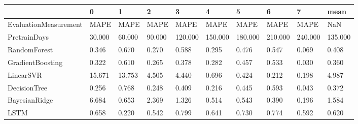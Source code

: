 \begin{tabular}{llllllllll}
\toprule
{} &      0 &      1 &      2 &       3 &       4 &       5 &       6 &       7 &    mean \\
\midrule
EvaluationMeasurement &   MAPE &   MAPE &   MAPE &    MAPE &    MAPE &    MAPE &    MAPE &    MAPE &     NaN \\
PretrainDays          & 30.000 & 60.000 & 90.000 & 120.000 & 150.000 & 180.000 & 210.000 & 240.000 & 135.000 \\
RandomForest          &  0.346 &  0.670 &  0.270 &   0.588 &   0.295 &   0.476 &   0.547 &   0.069 &   0.408 \\
GradientBoosting      &  0.322 &  0.610 &  0.265 &   0.378 &   0.282 &   0.457 &   0.533 &   0.030 &   0.360 \\
LinearSVR             & 15.671 & 13.753 &  4.505 &   4.440 &   0.696 &   0.424 &   0.212 &   0.198 &   4.987 \\
DecisionTree          &  0.256 &  0.768 &  0.248 &   0.409 &   0.216 &   0.445 &   0.593 &   0.043 &   0.372 \\
BayesianRidge         &  6.684 &  0.653 &  2.369 &   1.326 &   0.514 &   0.543 &   0.390 &   0.196 &   1.584 \\
LSTM                  &  0.658 &  0.220 &  0.542 &   0.799 &   0.641 &   0.730 &   0.774 &   0.592 &   0.620 \\
\bottomrule
\end{tabular}
